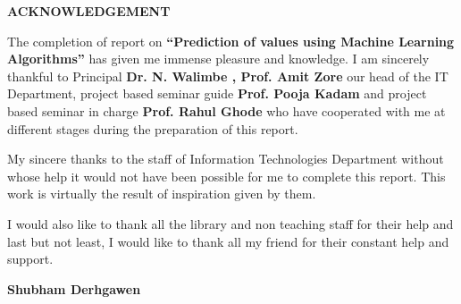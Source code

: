 \documentclass[12pt,times,a4paper]{report}
\renewcommand{\baselinestretch}{1.5}
\begin{document}
\newpage
\begin{center}
\thispagestyle{empty}
\renewcommand{\baselinestretch}{1.5}
{\fontsize{12}{10} \bf ACKNOWLEDGEMENT}\\
\begin{enumerate}
\vspace{0.4in}
The completion of report on \textbf{“Prediction of values using Machine Learning Algorithms”} has given me immense pleasure and knowledge. I am sincerely thankful to Principal \textbf{Dr. N. Walimbe , Prof. Amit Zore} our head of the IT Department, project based seminar guide \textbf{Prof. Pooja Kadam } and project based seminar in charge \textbf{Prof. Rahul Ghode} who have cooperated with me at different stages during the preparation of this report.

My sincere thanks to the staff of Information Technologies Department without whose help it
would not have been possible for me to complete this report. This work is virtually the result of
inspiration given by them.

I would also like to thank all the library and non teaching staff for their help and last but not
least, I would like to thank all my friend for their constant help and support.

\end{enumerate}
\end{center}
\vspace*{0.8in}
{\bf Shubham Derhgawen}\\


\newpage


\newpage







\end{document}
